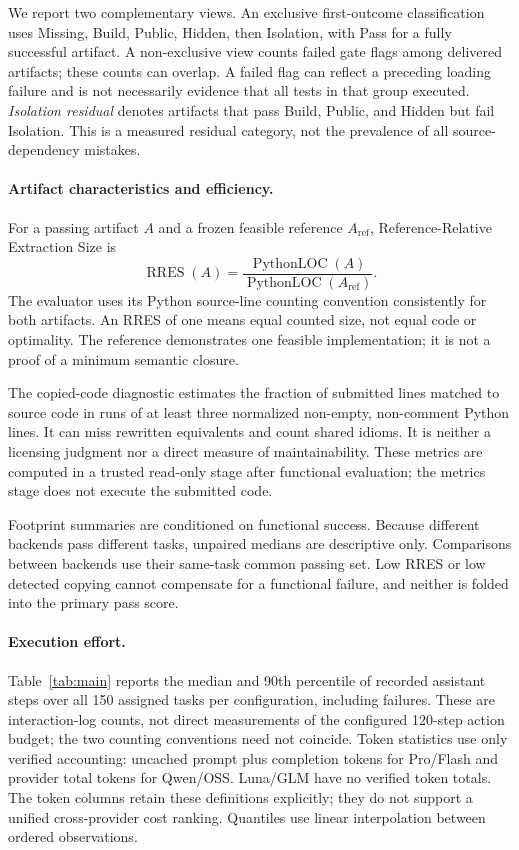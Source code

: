 \documentclass[acmsmall,screen,review,anonymous,nonacm]{acmart}
\begin{document}
We report two complementary views. An exclusive first-outcome classification
uses Missing, Build, Public, Hidden, then Isolation, with Pass for a fully
successful artifact. A non-exclusive view counts failed gate flags among
delivered artifacts; these counts can overlap. A failed flag can reflect a
preceding loading failure and is not necessarily evidence that all tests in that
group executed. \emph{Isolation residual} denotes artifacts that pass Build,
Public, and Hidden but fail Isolation. This is a measured residual category,
not the prevalence of all source-dependency mistakes.

\paragraph{Artifact characteristics and efficiency.}
\label{sec:metrics}

For a passing artifact $A$ and a frozen feasible reference $A_{\mathrm{ref}}$,
Reference-Relative Extraction Size is
\begin{equation}
 \operatorname{RRES}(A)=
 \frac{\operatorname{PythonLOC}(A)}{\operatorname{PythonLOC}(A_{\mathrm{ref}})}.
 \label{eq:rres}
\end{equation}
The evaluator uses its Python source-line counting convention consistently for
both artifacts. An RRES of one means equal counted size, not equal code or
optimality. The reference demonstrates one feasible implementation; it is not a
proof of a minimum semantic closure.

The copied-code diagnostic estimates the fraction of submitted lines matched
to source code in runs of at least three normalized non-empty, non-comment
Python lines. It can miss rewritten equivalents and count shared idioms. It is
neither a licensing judgment nor a direct measure of maintainability. These
metrics are computed in a trusted read-only stage after functional evaluation;
the metrics stage does not execute the submitted code.

Footprint summaries are conditioned on functional success. Because different
backends pass different tasks, unpaired medians are descriptive only. Comparisons
between backends use their same-task common passing set. Low RRES or low detected
copying cannot compensate for a functional failure, and neither is folded into
the primary pass score.

\paragraph{Execution effort.}
Table~\ref{tab:main} reports the median and 90th percentile of recorded assistant
steps over all 150 assigned tasks per configuration, including failures.
These are interaction-log counts, not direct measurements of the configured
120-step action budget; the two counting conventions need not coincide.
Token statistics use only verified accounting: uncached prompt plus completion
tokens for Pro/Flash and provider total tokens for Qwen/OSS. Luna/GLM have no
verified token totals. The token columns retain these definitions explicitly;
they do not support a unified cross-provider cost ranking. Quantiles use linear
interpolation between ordered observations.
\end{document}
